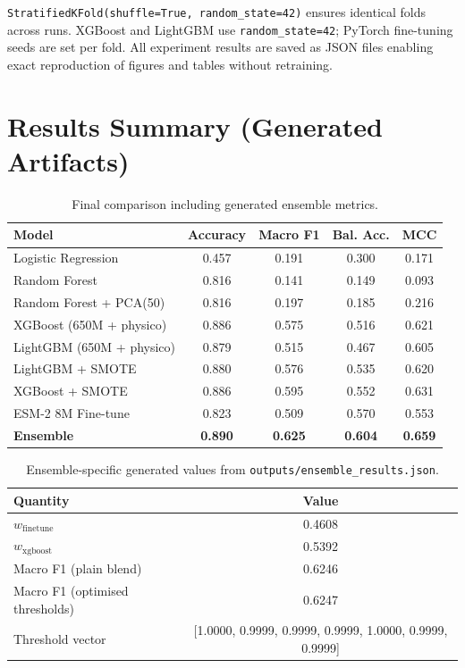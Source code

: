 \documentclass[11pt,a4paper]{article}
\begin{document}
\texttt{StratifiedKFold(shuffle=True, random\_state=42)} ensures identical folds across runs.
XGBoost and LightGBM use \texttt{random\_state=42}; PyTorch fine-tuning seeds are set per fold.
All experiment results are saved as JSON files enabling exact reproduction of figures and tables
without retraining.

\section{Results Summary (Generated Artifacts)}
\begin{table}[H]
\centering
\caption{Final comparison including generated ensemble metrics.}
\begin{tabular}{lcccc}
\toprule
Model & Accuracy & Macro F1 & Bal. Acc. & MCC \\
\midrule
Logistic Regression & 0.457 & 0.191 & 0.300 & 0.171 \\
Random Forest & 0.816 & 0.141 & 0.149 & 0.093 \\
Random Forest + PCA(50) & 0.816 & 0.197 & 0.185 & 0.216 \\
XGBoost (650M + physico) & 0.886 & 0.575 & 0.516 & 0.621 \\
LightGBM (650M + physico) & 0.879 & 0.515 & 0.467 & 0.605 \\
LightGBM + SMOTE & 0.880 & 0.576 & 0.535 & 0.620 \\
XGBoost + SMOTE & 0.886 & 0.595 & 0.552 & 0.631 \\
ESM-2 8M Fine-tune & 0.823 & 0.509 & 0.570 & 0.553 \\
\textbf{Ensemble} & \textbf{0.890} & \textbf{0.625} & \textbf{0.604} & \textbf{0.659} \\
\bottomrule
\end{tabular}
\end{table}

\begin{table}[H]
\centering
\caption{Ensemble-specific generated values from \texttt{outputs/ensemble\_results.json}.}
\begin{tabular}{lc}
\toprule
Quantity & Value \\
\midrule
$w_{\mathrm{finetune}}$ & 0.4608 \\
$w_{\mathrm{xgboost}}$ & 0.5392 \\
Macro F1 (plain blend) & 0.6246 \\
Macro F1 (optimised thresholds) & 0.6247 \\
Threshold vector & [1.0000, 0.9999, 0.9999, 0.9999, 1.0000, 0.9999, 0.9999] \\
\bottomrule
\end{tabular}
\end{table}
\end{document}
